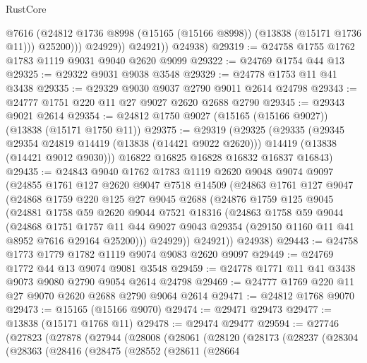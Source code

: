 \begin{lexlean}{RustCore}
\begin{coremodule}
                    @7616
                    (@24812 @1736 @8998 (@15165 (@15166 @8998)) (@13838 (@15171 @1736 @11)))
                    @25200)))
              @24929))
          @24921))
      @24938)
@29319 := @24758 @1755 @1762 @1783 @1119 @9031 @9040 @2620 @9099
@29322 := @24769 @1754 @44 @13
@29325 := @29322 @9031 @9038 @3548
@29329 := @24778 @1753 @11 @41 @3438
@29335 := @29329 @9030 @9037 @2790 @9011 @2614 @24798
@29343 := @24777 @1751 @220 @11 @27 @9027 @2620 @2688 @2790
@29345 := @29343 @9021 @2614
@29354 := @24812 @1750 @9027 (@15165 (@15166 @9027)) (@13838 (@15171 @1750 @11))
@29375 := @29319
    (@29325
      (@29335
        (@29345 @29354 @24819 @14419 (@13838 (@14421 @9022 @2620)))
        @14419
        (@13838 (@14421 @9012 @9030)))
      @16822
      @16825
      @16828
      @16832
      @16837
      @16843)
@29435 := @24843
    @9040
    @1762
    @1783
    @1119
    @2620
    @9048
    @9074
    @9097
    (@24855
      @1761
      @127
      @2620
      @9047
      @7518
      @14509
      (@24863
        @1761
        @127
        @9047
        (@24868
          @1759
          @220
          @125
          @27
          @9045
          @2688
          (@24876
            @1759
            @125
            @9045
            (@24881
              @1758
              @59
              @2620
              @9044
              @7521
              @18316
              (@24863
                @1758
                @59
                @9044
                (@24868
                  @1751
                  @1757
                  @11
                  @44
                  @9027
                  @9043
                  @29354
                  (@29150 @1160 @11 @41 @8952 @7616 @29164 @25200)))
              @24929))
          @24921))
      @24938)
@29443 := @24758 @1773 @1779 @1782 @1119 @9074 @9083 @2620 @9097
@29449 := @24769 @1772 @44 @13 @9074 @9081 @3548
@29459 := @24778 @1771 @11 @41 @3438 @9073 @9080 @2790 @9054 @2614 @24798
@29469 := @24777 @1769 @220 @11 @27 @9070 @2620 @2688 @2790 @9064 @2614
@29471 := @24812 @1768 @9070
@29473 := @15165 (@15166 @9070)
@29474 := @29471 @29473
@29477 := @13838 (@15171 @1768 @11)
@29478 := @29474 @29477
@29594 := @27746
    (@27823
      (@27878
        (@27944
          (@28008
            (@28061
              (@28120
                (@28173
                  (@28237
                    (@28304
                      (@28363
                        (@28416
                          (@28475
                            (@28552
                              (@28611
                                (@28664

\end{coremodule}
\end{lexlean}
